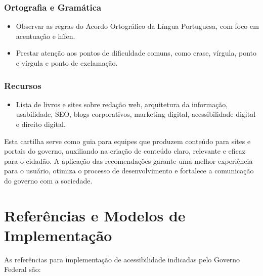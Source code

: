 \documentclass[
  12pt,
  openright,
  twoside,
  a4paper,
  english,
  french,
  spanish,
  brazil
]{abntex2}
\begin{document}
\subsection{Ortografia e Gramática}

\begin{itemize}
  \item Observar as regras do Acordo Ortográfico da Língua Portuguesa, com foco em acentuação e hífen.
  \item Prestar atenção aos pontos de dificuldade comuns, como crase, vírgula, ponto e vírgula e ponto de exclamação.
\end{itemize}

\subsection{Recursos}

\begin{itemize}
  \item Lista de livros e sites sobre redação web, arquitetura da informação, usabilidade, SEO, blogs corporativos, marketing digital, acessibilidade digital e direito digital.
\end{itemize}

Esta cartilha serve como guia para equipes que produzem conteúdo para sites e
portais do governo, auxiliando na criação de conteúdo claro, relevante e eficaz
para o cidadão. A aplicação das recomendações garante uma melhor experiência
para o usuário, otimiza o processo de desenvolvimento e fortalece a comunicação
do governo com a sociedade.

\chapter{Referências e Modelos de Implementação}

As referências para implementação de acessibilidade indicadas pelo Governo
Federal são:
\end{document}

